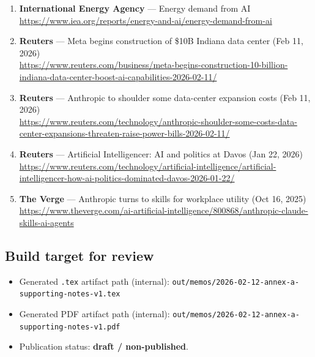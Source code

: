 \documentclass[
]{article}
\providecommand{\tightlist}{%
  \setlength{\itemsep}{0pt}\setlength{\parskip}{0pt}}
\begin{document}
\begin{enumerate}
  \url{https://www.reuters.com/technology/spacex-nvidia-deals-showing-ai-runs-capital-2026-02-06/}
\item
  \textbf{International Energy Agency} --- Energy demand from AI\\
  \url{https://www.iea.org/reports/energy-and-ai/energy-demand-from-ai}
\item
  \textbf{Reuters} --- Meta begins construction of \$10B Indiana data
  center (Feb 11, 2026)\\
  \url{https://www.reuters.com/business/meta-begins-construction-10-billion-indiana-data-center-boost-ai-capabilities-2026-02-11/}
\item
  \textbf{Reuters} --- Anthropic to shoulder some data-center expansion
  costs (Feb 11, 2026)\\
  \url{https://www.reuters.com/technology/anthropic-shoulder-some-costs-data-center-expansions-threaten-raise-power-bills-2026-02-11/}
\item
  \textbf{Reuters} --- Artificial Intelligencer: AI and politics at
  Davos (Jan 22, 2026)\\
  \url{https://www.reuters.com/technology/artificial-intelligence/artificial-intelligencer-how-ai-politics-dominated-davos-2026-01-22/}
\item
  \textbf{The Verge} --- Anthropic turns to skills for workplace utility
  (Oct 16, 2025)\\
  \url{https://www.theverge.com/ai-artificial-intelligence/800868/anthropic-claude-skills-ai-agents}
\end{enumerate}

\hypertarget{build-target-for-review}{%
\subsection{Build target for review}\label{build-target-for-review}}

\begin{itemize}
\tightlist
\item
  Generated \texttt{.tex} artifact path (internal):
  \texttt{out/memos/2026-02-12-annex-a-supporting-notes-v1.tex}
\item
  Generated PDF artifact path (internal):
  \texttt{out/memos/2026-02-12-annex-a-supporting-notes-v1.pdf}
\item
  Publication status: \textbf{draft / non-published}.
\end{itemize}
\end{document}
